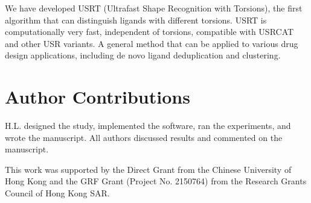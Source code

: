 \documentclass[twocolumn]{svjour3}          %
\begin{document}
We have developed USRT (Ultrafast Shape Recognition with Torsions), the first algorithm that can distinguish ligands with different torsions. USRT is computationally very fast, independent of torsions, compatible with USRCAT and other USR variants.
A general method that can be applied to various drug design applications, including de novo ligand deduplication and clustering.

\section{Author Contributions}

H.L. designed the study, implemented the software, ran the experiments, and wrote the manuscript. All authors discussed results and commented on the manuscript.

\begin{acknowledgements}

This work was supported by the Direct Grant from the Chinese University of Hong Kong and the GRF Grant (Project No. 2150764) from the Research Grants Council of Hong Kong SAR.

\end{acknowledgements}

\end{document}
